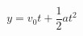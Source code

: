 \documentclass{jarticle}
\begin{document}
\[
    y
    = v_0 t + \frac{1}{2} a t^2
\]
\end{document}

